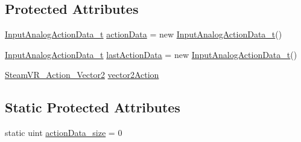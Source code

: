 \subsection*{Protected Attributes}
\begin{DoxyCompactItemize}
\item 
\mbox{\hyperlink{struct_valve_1_1_v_r_1_1_input_analog_action_data__t}{Input\+Analog\+Action\+Data\+\_\+t}} \mbox{\hyperlink{class_valve_1_1_v_r_1_1_steam_v_r___action___vector2___source_a83a369d6d658bbf4a5c13e65405ed929}{action\+Data}} = new \mbox{\hyperlink{struct_valve_1_1_v_r_1_1_input_analog_action_data__t}{Input\+Analog\+Action\+Data\+\_\+t}}()
\item 
\mbox{\hyperlink{struct_valve_1_1_v_r_1_1_input_analog_action_data__t}{Input\+Analog\+Action\+Data\+\_\+t}} \mbox{\hyperlink{class_valve_1_1_v_r_1_1_steam_v_r___action___vector2___source_a249b038190420f6170b534360c64b9b1}{last\+Action\+Data}} = new \mbox{\hyperlink{struct_valve_1_1_v_r_1_1_input_analog_action_data__t}{Input\+Analog\+Action\+Data\+\_\+t}}()
\item 
\mbox{\hyperlink{class_valve_1_1_v_r_1_1_steam_v_r___action___vector2}{Steam\+V\+R\+\_\+\+Action\+\_\+\+Vector2}} \mbox{\hyperlink{class_valve_1_1_v_r_1_1_steam_v_r___action___vector2___source_aa2d934cbaf6f11951219928fad13721b}{vector2\+Action}}
\end{DoxyCompactItemize}
\subsection*{Static Protected Attributes}
\begin{DoxyCompactItemize}
\item 
static uint \mbox{\hyperlink{class_valve_1_1_v_r_1_1_steam_v_r___action___vector2___source_ae212df15f42bee205429f9e0eb40cfc8}{action\+Data\+\_\+size}} = 0
\end{DoxyCompactItemize}
